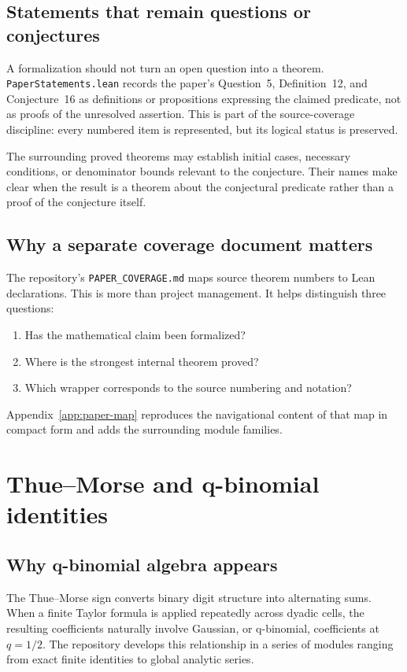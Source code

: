 \documentclass[11pt,oneside]{article}
\theoremstyle{definition}
\theoremstyle{remark}
\begin{document}
\subsection{Statements that remain questions or conjectures}
A formalization should not turn an open question into a theorem.  \nolinkurl{PaperStatements.lean} records the paper's Question~5, Definition~12, and Conjecture~16 as definitions or propositions expressing the claimed predicate, not as proofs of the unresolved assertion.  This is part of the source-coverage discipline: every numbered item is represented, but its logical status is preserved.

The surrounding proved theorems may establish initial cases, necessary conditions, or denominator bounds relevant to the conjecture.  Their names make clear when the result is a theorem about the conjectural predicate rather than a proof of the conjecture itself.

\subsection{Why a separate coverage document matters}
The repository's \nolinkurl{PAPER_COVERAGE.md} maps source theorem numbers to Lean declarations.  This is more than project management.  It helps distinguish three questions:
\begin{enumerate}
  \item Has the mathematical claim been formalized?
  \item Where is the strongest internal theorem proved?
  \item Which wrapper corresponds to the source numbering and notation?
\end{enumerate}
Appendix~\ref{app:paper-map} reproduces the navigational content of that map in compact form and adds the surrounding module families.

\section{Thue--Morse and q-binomial identities}\label{ch:qbinomial}

\subsection{Why q-binomial algebra appears}
The Thue--Morse sign converts binary digit structure into alternating sums.  When a finite Taylor formula is applied repeatedly across dyadic cells, the resulting coefficients naturally involve Gaussian, or q-binomial, coefficients at \(q=1/2\).  The repository develops this relationship in a series of modules ranging from exact finite identities to global analytic series.
\end{document}

